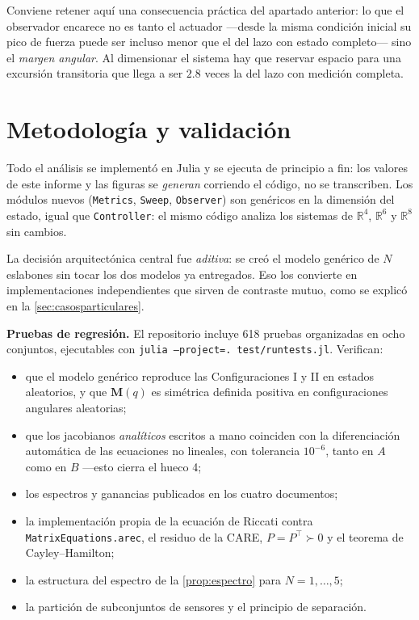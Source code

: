 \documentclass[11pt,letterpaper]{article}
\theoremstyle{definition}
\theoremstyle{plain}
\theoremstyle{remark}
\newcommand{\R}{\mathbb{R}}
\newcommand{\Mm}{\bm{M}}
\begin{document}
Conviene retener aquí una consecuencia práctica del apartado anterior: lo que el
observador encarece no es tanto el actuador ---desde la misma condición inicial
su pico de fuerza puede ser incluso menor que el del lazo con estado completo---
sino el \emph{margen angular}. Al dimensionar el sistema hay que reservar espacio
para una excursión transitoria que llega a ser $2.8$ veces la del lazo con
medición completa.

\section{Metodología y validación}
\label{sec:metodologia}

Todo el análisis se implementó en Julia y se ejecuta de principio a fin: los
valores de este informe y las figuras se \emph{generan} corriendo el código, no
se transcriben. Los módulos nuevos (\texttt{Metrics}, \texttt{Sweep},
\texttt{Observer}) son genéricos en la dimensión del estado, igual que
\texttt{Controller}: el mismo código analiza los sistemas de $\R^4$, $\R^6$ y
$\R^8$ sin cambios.

La decisión arquitectónica central fue \emph{aditiva}: se creó el modelo
genérico de $N$ eslabones sin tocar los dos modelos ya entregados. Eso los
convierte en implementaciones independientes que sirven de contraste mutuo,
como se explicó en la \cref{sec:casosparticulares}.

\textbf{Pruebas de regresión.} El repositorio incluye 618 pruebas organizadas en
ocho conjuntos, ejecutables con
\texttt{julia --project=. test/runtests.jl}. Verifican:

\begin{itemize}
  \item que el modelo genérico reproduce las Configuraciones I y II en estados
  aleatorios, y que $\Mm(q)$ es simétrica definida positiva en configuraciones
  angulares aleatorias;
  \item que los jacobianos \emph{analíticos} escritos a mano coinciden con la
  diferenciación automática de las ecuaciones no lineales, con tolerancia
  $10^{-6}$, tanto en $A$ como en $B$ ---esto cierra el hueco 4;
  \item los espectros y ganancias publicados en los cuatro documentos;
  \item la implementación propia de la ecuación de Riccati contra
  \texttt{MatrixEquations.arec}, el residuo de la CARE, $P=P^\top\succ0$ y el
  teorema de Cayley--Hamilton;
  \item la estructura del espectro de la \cref{prop:espectro} para
  $N=1,\dots,5$;
  \item la partición de subconjuntos de sensores y el principio de separación.
\end{itemize}
\end{document}
